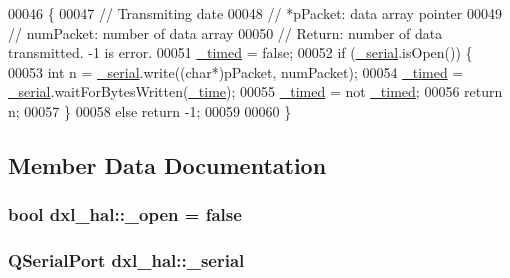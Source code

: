 \begin{DoxyCode}
00046 \{
00047     \textcolor{comment}{// Transmiting date}
00048     \textcolor{comment}{// *pPacket: data array pointer}
00049     \textcolor{comment}{// numPacket: number of data array}
00050     \textcolor{comment}{// Return: number of data transmitted. -1 is error.}
00051     \hyperlink{classdxl__hal_a10d474daa3ca42b5c5ceb6558a955ca1}{\_timed} = \textcolor{keyword}{false};
00052     \textcolor{keywordflow}{if} (\hyperlink{classdxl__hal_a785d0e35b81d779b54869cad668f9745}{\_serial}.isOpen()) \{
00053         \textcolor{keywordtype}{int} n = \hyperlink{classdxl__hal_a785d0e35b81d779b54869cad668f9745}{\_serial}.write((\textcolor{keywordtype}{char}*)pPacket, numPacket);
00054         \hyperlink{classdxl__hal_a10d474daa3ca42b5c5ceb6558a955ca1}{\_timed} = \hyperlink{classdxl__hal_a785d0e35b81d779b54869cad668f9745}{\_serial}.waitForBytesWritten(\hyperlink{classdxl__hal_ae3d8733b5ca778b070218765ca0746ac}{\_time});
00055         \hyperlink{classdxl__hal_a10d474daa3ca42b5c5ceb6558a955ca1}{\_timed} = not \hyperlink{classdxl__hal_a10d474daa3ca42b5c5ceb6558a955ca1}{\_timed};
00056         \textcolor{keywordflow}{return} n;
00057     \}
00058     \textcolor{keywordflow}{else} \textcolor{keywordflow}{return} -1;
00059 
00060 \}
\end{DoxyCode}


\subsection{Member Data Documentation}
\hypertarget{classdxl__hal_a04831154c43fe4f7499ea0950e0f0999}{}
\subsubsection[{\+\_\+open}]{\setlength{\rightskip}{0pt plus 5cm}bool dxl\+\_\+hal\+::\+\_\+open = false\hspace{0.3cm}{\ttfamily [private]}}\label{classdxl__hal_a04831154c43fe4f7499ea0950e0f0999}
\hypertarget{classdxl__hal_a785d0e35b81d779b54869cad668f9745}{}
\subsubsection[{\+\_\+serial}]{\setlength{\rightskip}{0pt plus 5cm}Q\+Serial\+Port dxl\+\_\+hal\+::\+\_\+serial\hspace{0.3cm}{\ttfamily [private]}}\label{classdxl__hal_a785d0e35b81d779b54869cad668f9745}
\hypertarget{classdxl__hal_ae3d8733b5ca778b070218765ca0746ac}{}
